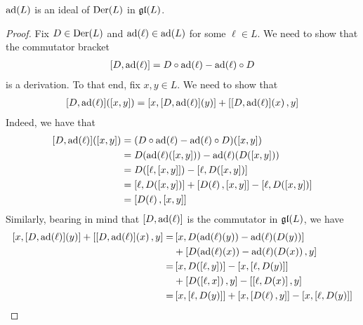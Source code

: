 \begin{boxlemma}
    $\operatorname{ad}\!\left( L \right)$ is an ideal of $\operatorname{Der}\!\left( L \right)$ in $\mathfrak{gl}\!\left( L \right)$.
\end{boxlemma}
\begin{proof}
    Fix $D \in \operatorname{Der}\!\left( L \right)$ and $\operatorname{ad}\!\left( \ell \right) \in \operatorname{ad}\!\left( L \right)$ for some $\ell \in L$. We need to show that the commutator bracket
    \begin{align*}
        \left[ D, \operatorname{ad}\!\left( \ell \right) \right] = D \circ \operatorname{ad}\!\left( \ell \right) - \operatorname{ad}\!\left( \ell \right) \circ D
    \end{align*}
    is a derivation. To that end, fix $x, y \in L$. We need to show that
    \begin{align}
        \left[ D, \operatorname{ad}\!\left( \ell \right) \right]\!\left( \left[ x, y \right] \right) = \left[ x, \left[ D, \operatorname{ad}\!\left( \ell \right) \right]\!\left( y \right) \right] + \left[ \left[ D, \operatorname{ad}\!\left( \ell \right) \right]\!\left( x \right), y \right]
        \label{Ch1:Eq:ad_ideal_der}
    \end{align}
    Indeed, we have that
    \begin{align}
        \brac{D, \pad{\ell}}\of{\brac{x, y}}
        &= \parenth{D \circ \pad{\ell} - \pad{\ell} \circ D}\of{\brac{x, y}} \nonumber \\
        &= D\of{\pad{\ell}\of{\brac{x, y}}} - \pad{\ell}\of{D\of{\brac{x, y}}} \nonumber \\
        &= D\of{\brac{\ell, \brac{x, y}}} - \brac{\ell, D\of{\brac{x, y}}} \nonumber \\
        &= \brac{\ell, D\of{\brac{x, y}}} + \brac{D\of{\ell}, \brac{x, y}} - \brac{\ell, D\of{\brac{x, y}}} \nonumber \\
        &= \brac{D\of{\ell}, \brac{x, y}} \label{Ch1:Eq:ad_ideal_der_LHS}
    \end{align}
    Similarly, bearing in mind that $\left[ D, \operatorname{ad}\!\left( \ell \right) \right]$ is the commutator in $\mathfrak{gl}\!\left( L \right)$, we have
    \begin{align}
        \brac{x, \brac{D, \pad{\ell}}\of{y}} + \brac{\brac{D, \pad{\ell}}\of{x}, y}
        =& \brac{x, D\of{\pad{\ell}\of{y}} - \pad{\ell}\of{D\of{y}}} \nonumber \\
        &+ \brac{D\of{\pad{\ell}\of{x}} - \pad{\ell}\of{D\of{x}}, y} \nonumber \\
        =& \brac{x, D\of{\brac{\ell, y}}} - \brac{x, \brac{\ell, D\of{y}}} \nonumber \\
        &+ \brac{D\of{\brac{\ell, x}}, y} - \brac{\brac{\ell, D\of{x}}, y} \nonumber \\
        =& \brac{x, \brac{\ell, D(y)}} + \brac{x, \brac{D\of{\ell}, y}} - \brac{x, \brac{\ell, D\of{y}}} \nonumber \\

\end{align}
\end{proof}
